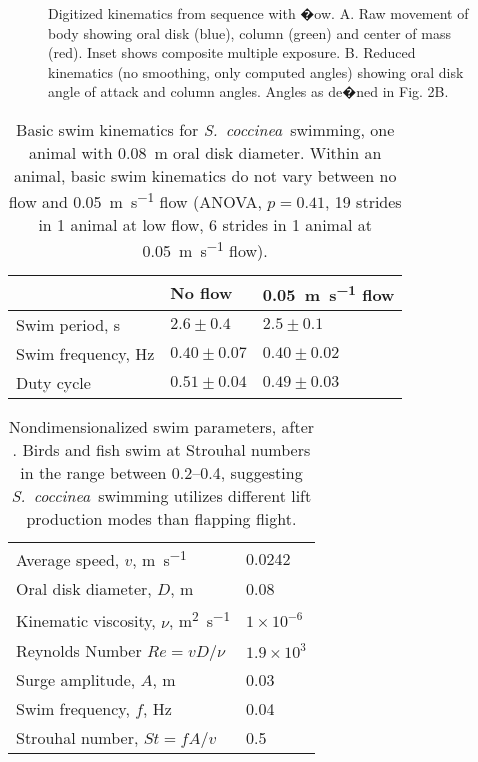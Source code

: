 \documentclass[10pt]{article}
\newcommand{\Genus}[1]{\emph{#1}}
\newcommand{\Stomphia}{\Genus{S.~coccinea}}
\begin{document}
\begin{figure}
\caption{Digitized kinematics from sequence with �ow.  A.  Raw movement of body showing oral disk (blue), column (green) and center of mass (red).  Inset shows composite multiple exposure.  B.  Reduced kinematics (no smoothing, only computed angles) showing oral disk angle of attack and column angles. Angles as de�ned in Fig. 2B.  }
\label{fig:4}
\end{figure}

\begin{table}
\caption{Basic swim kinematics for \Stomphia\ swimming, one animal with \SI{0.08}{\meter} oral disk diameter.  Within an animal, basic swim kinematics do not vary between no flow and \SI{0.05}{\meter\per\second} flow (ANOVA, $p=0.41$, 19 strides in 1 animal at low flow, 6 strides in 1 animal at \SI{0.05}{\meter\per\second} flow).}
\begin{center}
\begin{tabular}{lll}
                      		& No flow 			& \SI{0.05}{\meter\per\second} flow 	\\ \hline
Swim period, \si{\second} 		& $2.6 \pm 0.4$ 	& $2.5 \pm 0.1$ 			\\ 
Swim frequency, \si{\hertz} 	& $0.40 \pm 0.07$	& $0.40\pm 0.02$			\\ 
Duty cycle 		& $0.51 \pm 0.04$	& $0.49 \pm 0.03$			\\
\end{tabular}
\end{center}
\label{table:1} 
\end{table}


\begin{table}
\caption{Nondimensionalized swim parameters, after \citep{Pesavento:2004, Andersen:2005, Andersen:2005a, Taylor:2003}.  Birds and fish swim at Strouhal numbers in the range between \numrange{0.2}{0.4}, suggesting \Stomphia\ swimming utilizes different lift production modes than flapping flight.}
\begin{center}
\begin{tabular}{ll}
Average speed, $v$, \si{\meter\per\second} 					& 0.0242 \\
Oral disk diameter, $D$, \si{\meter}	 				& 0.08 \\
Kinematic viscosity, $\nu$, \si{\meter\squared\per\second} 	& $1 \times 10^{-6}$ \\
Reynolds Number $Re=vD/\nu$  					& $1.9 \times 10^3$ \\
Surge amplitude, $A$, \si{\meter} 						& 0.03 \\
Swim frequency, $f$, \si{\hertz} 						& 0.04 \\
Strouhal number, $St=fA/v$  						& 0.5 \\
\end{tabular}
\end{center}
\label{table:2} 
\end{table}
\end{document}
